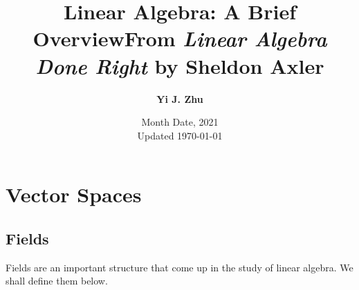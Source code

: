 \documentclass[12pt]{report}
\numberwithin{equation}{section}
\theoremstyle{definition}
\begin{document}
	
	\title{\textbf{Linear Algebra: A Brief Overview\newline\normalsize From \textit{Linear Algebra Done Right} by Sheldon Axler }}
	\author{\textbf{Yi J. Zhu}}
	\date{Month Date, 2021\\\vspace{1em}\small Updated \today}
	\maketitle
	\thispagestyle{empty}
	
	\tableofcontents
	
	\chapter{Vector Spaces}
	
	\section{Fields}
	
	Fields are an important structure that come up in the study of linear algebra. We shall define them below.
	
\end{document}
